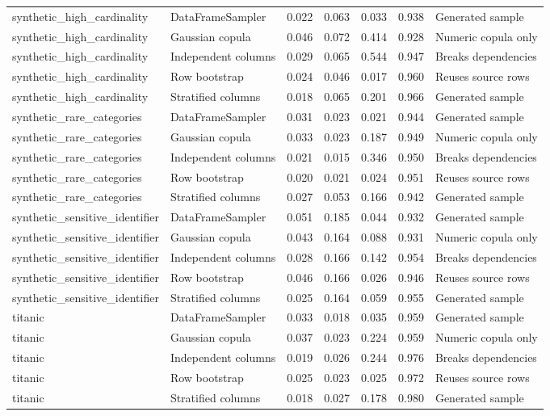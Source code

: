 \begin{table}
\begin{adjustbox}{max width=\columnwidth}
\begin{tabular}{llrrrrl}
synthetic\_high\_cardinality & DataFrameSampler & 0.022 & 0.063 & 0.033 & 0.938 & Generated sample \\
synthetic\_high\_cardinality & Gaussian copula & 0.046 & 0.072 & 0.414 & 0.928 & Numeric copula only \\
synthetic\_high\_cardinality & Independent columns & 0.029 & 0.065 & 0.544 & 0.947 & Breaks dependencies \\
synthetic\_high\_cardinality & Row bootstrap & 0.024 & 0.046 & 0.017 & 0.960 & Reuses source rows \\
synthetic\_high\_cardinality & Stratified columns & 0.018 & 0.065 & 0.201 & 0.966 & Generated sample \\
synthetic\_rare\_categories & DataFrameSampler & 0.031 & 0.023 & 0.021 & 0.944 & Generated sample \\
synthetic\_rare\_categories & Gaussian copula & 0.033 & 0.023 & 0.187 & 0.949 & Numeric copula only \\
synthetic\_rare\_categories & Independent columns & 0.021 & 0.015 & 0.346 & 0.950 & Breaks dependencies \\
synthetic\_rare\_categories & Row bootstrap & 0.020 & 0.021 & 0.024 & 0.951 & Reuses source rows \\
synthetic\_rare\_categories & Stratified columns & 0.027 & 0.053 & 0.166 & 0.942 & Generated sample \\
synthetic\_sensitive\_identifier & DataFrameSampler & 0.051 & 0.185 & 0.044 & 0.932 & Generated sample \\
synthetic\_sensitive\_identifier & Gaussian copula & 0.043 & 0.164 & 0.088 & 0.931 & Numeric copula only \\
synthetic\_sensitive\_identifier & Independent columns & 0.028 & 0.166 & 0.142 & 0.954 & Breaks dependencies \\
synthetic\_sensitive\_identifier & Row bootstrap & 0.046 & 0.166 & 0.026 & 0.946 & Reuses source rows \\
synthetic\_sensitive\_identifier & Stratified columns & 0.025 & 0.164 & 0.059 & 0.955 & Generated sample \\
titanic & DataFrameSampler & 0.033 & 0.018 & 0.035 & 0.959 & Generated sample \\
titanic & Gaussian copula & 0.037 & 0.023 & 0.224 & 0.959 & Numeric copula only \\
titanic & Independent columns & 0.019 & 0.026 & 0.244 & 0.976 & Breaks dependencies \\
titanic & Row bootstrap & 0.025 & 0.023 & 0.025 & 0.972 & Reuses source rows \\
titanic & Stratified columns & 0.018 & 0.027 & 0.178 & 0.980 & Generated sample \\
\bottomrule
\end{tabular}
\end{adjustbox}
\end{table}

